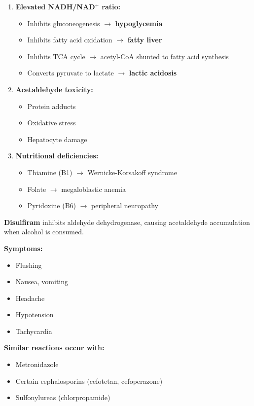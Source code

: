 \begin{enumerate}
    \item \textbf{Elevated NADH/NAD$^+$ ratio:}
    \begin{itemize}
        \item Inhibits gluconeogenesis $\rightarrow$ \textbf{hypoglycemia}
        \item Inhibits fatty acid oxidation $\rightarrow$ \textbf{fatty liver}
        \item Inhibits TCA cycle $\rightarrow$ acetyl-CoA shunted to fatty acid synthesis
        \item Converts pyruvate to lactate $\rightarrow$ \textbf{lactic acidosis}
    \end{itemize}
    
    \item \textbf{Acetaldehyde toxicity:}
    \begin{itemize}
        \item Protein adducts
        \item Oxidative stress
        \item Hepatocyte damage
    \end{itemize}
    
    \item \textbf{Nutritional deficiencies:}
    \begin{itemize}
        \item Thiamine (B1) $\rightarrow$ Wernicke-Korsakoff syndrome
        \item Folate $\rightarrow$ megaloblastic anemia
        \item Pyridoxine (B6) $\rightarrow$ peripheral neuropathy
    \end{itemize}
\end{enumerate}

\begin{tcolorbox}[colback=purple!5, colframe=purple!70!black, title=\textbf{Clinical Pearl: Disulfiram Reaction}]
\textbf{Disulfiram} inhibits aldehyde dehydrogenase, causing acetaldehyde accumulation when alcohol is consumed.

\textbf{Symptoms:}
\begin{itemize}
    \item Flushing
    \item Nausea, vomiting
    \item Headache
    \item Hypotension
    \item Tachycardia
\end{itemize}

\textbf{Similar reactions occur with:}
\begin{itemize}
    \item Metronidazole
    \item Certain cephalosporins (cefotetan, cefoperazone)
    \item Sulfonylureas (chlorpropamide)
\end{itemize}
\end{tcolorbox}

